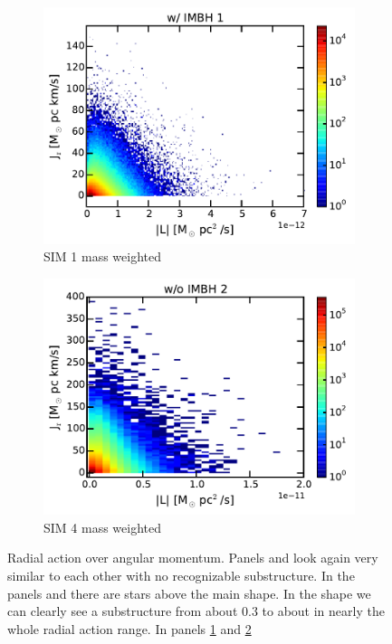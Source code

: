 \begin{figure}[htbp]
\begin{subfigure}{0.475\textwidth}
		\includegraphics[width=\textwidth]{Plots/L_J_r_mass_hist_IMBH1.pdf}
		\caption{SIM 1 mass weighted}
		\label{fig:L_J_r_mass_hist_IMBH1}
	\end{subfigure}
	\hfill
	\begin{subfigure}{0.475\textwidth}
		\includegraphics[width=\textwidth]{Plots/L_J_r_mass_hist_noIMBH2.pdf}
		\caption{SIM 4 mass weighted}
		\label{fig:L_J_r_mass_hist_noIMBH2}
	\end{subfigure}
	\caption{Radial action over angular momentum. Panels  and  look again very similar to each other with no recognizable substructure. In the panels  and  there are stars above the main shape. In the shape we can clearly see a substructure from about 0.3 to about  in nearly the whole radial action range. In panels \ref{fig:L_J_r_mass_hist_IMBH1} and \ref{fig:L_J_r_mass_hist_noIMBH2} }
	\label{fig:L_J_r_hist}
\end{figure}

